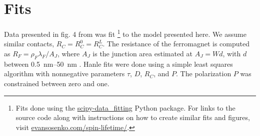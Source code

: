 \section{Fits}
\label{s:fits}

Data presented in fig. 4 from \cite{PhysRevLett.105.167202}
was fit
\footnote{
  Fits done using the
  \href{https://github.com/razor-x/scipy-data_fitting}{scipy-data\_fitting}
  Python package.
  For links to the source code along with instructions
  on how to create similar fits and figures, visit
  \href{hhttp://evansosenko.com/spin-lifetime/}{evansosenko.com/spin-lifetime/}.
}
\cite{Hunter:2007}
to the model presented here.
We assume similar contacts, $R_C = R_C^0 = R_C^L$.
The resistance of the ferromagnet  is computed as
$R_F = ρ_F λ_F / A_J$,
where $A_J$ is the junction area estimated at $A_J = W d$,
with $d$ between \SIrange[range-phrase={ and }]{0.5}{50}{\nano \meter}
\cite{PhysRevLett.105.167202}.
Hanle fits were done using a simple least squares algorithm
with nonnegative parameters $τ$, $D$, $R_C$, and $P$.
The polarization $P$ was constrained between zero and one.

